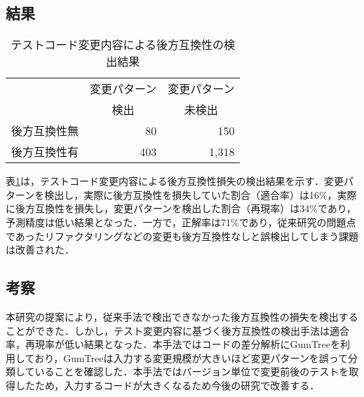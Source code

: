 \documentclass[T,J]{fose} %
\begin{document}
\subsection{結果}

\begin{table}[]
\centering
\caption{テストコード変更内容による後方互換性の検出結果}
\begin{tabular}{l|r|r}
\hline
\multicolumn{1}{c|}{} & \multicolumn{1}{c|}{変更パターン} & \multicolumn{1}{c}{変更パターン} \\ 
\multicolumn{1}{c|}{} & \multicolumn{1}{c|}{検出} & \multicolumn{1}{c}{未検出} \\ \hline
後方互換性無 & 80 & 150 \\ \hline
後方互換性有 & 403 & 1,318 \\ \hline
\end{tabular}
\label{table_pattern}
\end{table}


表\ref{table_pattern}は，テストコード変更内容による後方互換性損失の検出結果を示す．変更パターンを検出し，実際に後方互換性を損失していた割合（適合率）は16\%，実際に後方互換性を損失し，変更パターンを検出した割合（再現率）は34\%であり，予測精度は低い結果となった．一方で，正解率は71\%であり，従来研究の問題点であったリファクタリングなどの変更も後方互換性なしと誤検出してしまう課題は改善された．

\subsection{考察}
本研究の提案により，従来手法で検出できなかった後方互換性の損失を検出することができた．しかし，テスト変更内容に基づく後方互換性の検出手法は適合率，再現率が低い結果となった．本手法ではコードの差分解析にGumTreeを利用しており，GumTreeは入力する変更規模が大きいほど変更パターンを誤って分類していることを確認した．本手法ではバージョン単位で変更前後のテストを取得したため，入力するコードが大きくなるため今後の研究で改善する．


\end{document}
